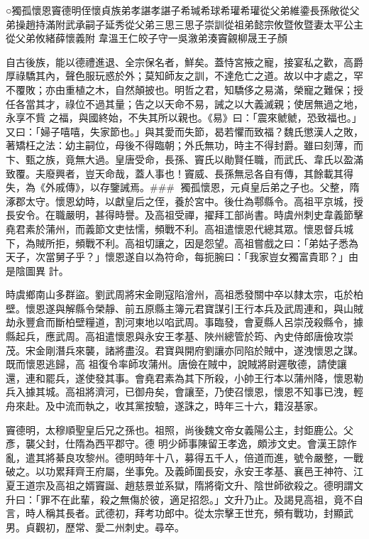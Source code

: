 
\begin{pinyinscope}

 ○獨孤懷恩竇德明侄懷貞族弟孝諶孝諶子希瑊希球希瓘希瓘從父弟維鍌長孫敞從父弟操趙持滿附武承嗣子延秀從父弟三思三思子崇訓從祖弟懿宗攸暨攸暨妻太平公主從父弟攸緒薛懷義附
 韋溫王仁皎子守一吳漵弟湊竇覦柳晟王子顏



 自古後族，能以德禮進退、全宗保名者，鮮矣。蓋恃宮掖之寵，接宴私之歡，高爵厚祿驕其內，聲色服玩惑於外；莫知師友之訓，不達危亡之道。故以中才處之，罕不覆敗；亦由重植之木，自然顛披也。明哲之君，知驕侈之易滿，榮寵之難保；授任各當其才，祿位不過其量；告之以天命不易，誡之以大義滅親；使居無過之地，永享不貲
 之福，與國終始，不失其所以親也。《易》曰：「震來虩虩，恐致福也。」又曰：「婦子嘻嘻，失家節也。」與其愛而失節，曷若懼而致福？魏氏懲漢人之敗，著矯枉之法：幼主嗣位，母後不得臨朝；外氏無功，時主不得封爵。雖曰刻薄，而卞、甄之族，竟無大過。皇唐受命，長孫、竇氏以勛賢任職，而武氏、韋氏以盈滿致覆。夫廢興者，豈天命哉，蓋人事也！竇威、長孫無忌各自有傳，其餘載其得失，為《外戚傳》，以存鑒誡焉。###
 獨孤懷恩，元貞皇后弟之子也。父整，隋涿郡太守。懷恩幼時，以獻皇后之侄，養於宮中。後仕為鄠縣令。高祖平京城，授長安令。在職嚴明，甚得時譽。及高祖受禪，擢拜工部尚書。時虞州刺史韋義節擊堯君素於蒲州，而義節文吏怯懦，頻戰不利。高祖遣懷恩代總其眾。懷恩督兵城下，為賊所拒，頻戰不利。高祖切讓之，因是怨望。高祖嘗戲之曰：「弟姑子悉為天子，次當舅子乎？」懷恩遂自以為符命，每扼腕曰：「我家豈女獨富貴耶？」由是陰圖異
 計。



 時虞鄉南山多群盜。劉武周將宋金剛寇陷澮州，高祖悉發關中卒以隸太宗，屯於柏壁。懷恩遂與解縣令榮靜、前五原縣主簿元君寶謀引王行本兵及武周連和，與山賊劫永豐倉而斷柏壁糧道，割河東地以啗武周。事臨發，會夏縣人呂崇茂殺縣令，據縣起兵，應武周。高祖遣懷恩與永安王孝基、陜州總管於筠、內史侍郎唐儉攻崇茂。宋金剛潛兵來襲，諸將盡沒。君寶與開府劉讓亦同陷於賊中，遂洩懷恩之謀。既而懷恩逃歸，高
 祖復令率師攻蒲州。唐儉在賊中，說賊將尉遲敬德，請使讓還，連和罷兵，遂使發其事。會堯君素為其下所殺，小帥王行本以蒲州降，懷恩勒兵入據其城。高祖將濟河，已御舟矣，會讓至，乃使召懷恩，懷恩不知事已洩，輕舟來赴。及中流而執之，收其黨按驗，遂誅之，時年三十六，籍沒基家。



 竇德明，太穆順聖皇后兄之孫也。祖照，尚後魏文帝女義陽公主，封鉅鹿公。父彥，襲父封，仕隋為西平郡守。德
 明少師事陳留王孝逸，頗涉文史。會漢王諒作亂，遣其將綦良攻黎州。德明時年十八，募得五千人，倍道而進，號令嚴整，一戰破之。以功累拜齊王府屬，坐事免。及義師圍長安，永安王孝基、襄邑王神符、江夏王道宗及高祖之婿竇誕、趙慈景並系獄，隋將衛文升、陰世師欲殺之。德明謂文升曰：「罪不在此輩，殺之無傷於彼，適足招怨。」文升乃止。及謁見高祖，竟不自言，時人稱其長者。武德初，拜考功郎中。從太宗擊王世充，頻有戰功，封顯武
 男。貞觀初，歷常、愛二州刺史。尋卒。




\end{pinyinscope}
